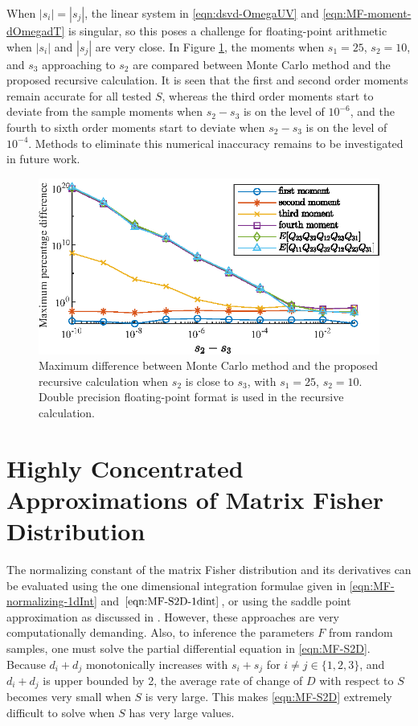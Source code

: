 When $|s_i|=|s_j|$, the linear system in \eqref{eqn:dsvd-OmegaUV} and \eqref{eqn:MF-moment-dOmegadT} is singular, so this poses a challenge for floating-point arithmetic when $|s_i|$ and $|s_j|$ are very close.
In Figure \ref{fig:MF-moment-error-degenerate}, the moments when $s_1=25$, $s_2=10$, and $s_3$ approaching to $s_2$ are compared between Monte Carlo method and the proposed recursive calculation.
It is seen that the first and second order moments remain accurate for all tested $S$, whereas the third order moments start to deviate from the sample moments when $s_2-s_3$ is on the level of $10^{-6}$, and the fourth to sixth order moments start to deviate when $s_2-s_3$ is on the level of $10^{-4}$.
Methods to eliminate this numerical inaccuracy remains to be investigated in future work.

\begin{figure}
	\centering
	\includegraphics[scale=1.4]{figures/MF-moment-error-degenerate}
	\caption[Maximum difference between Monte Carlo method and the proposed recursive calculation when $s_2$ is close to $s_3$ for moments of the matrix Fisher distribution.]{Maximum difference between Monte Carlo method and the proposed recursive calculation when $s_2$ is close to $s_3$, with $s_1=25$, $s_2=10$.
	Double precision floating-point format is used in the recursive calculation. \label{fig:MF-moment-error-degenerate}}
\end{figure}

\section{Highly Concentrated Approximations of Matrix Fisher Distribution} \label{section:MF-approx}

The normalizing constant of the matrix Fisher distribution and its derivatives can be evaluated using the one dimensional integration formulae given in \eqref{eqn:MF-normalizing-1dInt} and $\eqref{eqn:MF-S2D-1dint}$, or using the saddle point approximation as discussed in \cite{gilitschenski2014efficient}.
However, these approaches are very computationally demanding.
Also, to inference the parameters $F$ from random samples, one must solve the partial differential equation in \eqref{eqn:MF-S2D}.
Because $d_i+d_j$ monotonically increases with $s_i+s_j$ for $i\neq j \in \{1,2,3\}$, and $d_i+d_j$ is upper bounded by 2, the average rate of change of $D$ with respect to $S$ becomes very small when $S$ is very large.
This makes \eqref{eqn:MF-S2D} extremely difficult to solve when $S$ has very large values.

